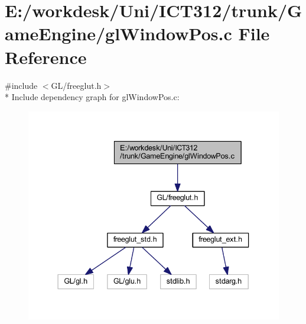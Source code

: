 \section{E\+:/workdesk/\+Uni/\+I\+C\+T312/trunk/\+Game\+Engine/gl\+Window\+Pos.c File Reference}
\label{gl_window_pos_8c}
{\ttfamily \#include $<$G\+L/freeglut.\+h$>$}\\*
Include dependency graph for gl\+Window\+Pos.\+c\+:\nopagebreak
\begin{figure}[H]
\begin{center}
\leavevmode
\includegraphics[width=337pt]{da/d81/gl_window_pos_8c__incl}
\end{center}
\end{figure}
